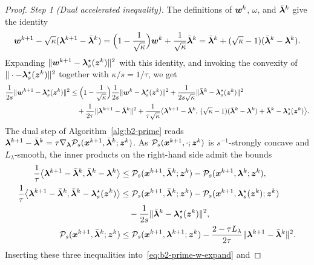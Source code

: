 \begin{proof}
\emph{Step 1 (Dual accelerated inequality).} The definitions of \(\bm{w}^k\), \(\omega\), and \(\bar{\bm{\lambda}}^k\) give the identity
\[
    \bm{w}^{k+1}-\sqrt{\kappa}(\bm{\lambda}^{k+1}-\bar{\bm{\lambda}}^k)
    =\Bigl(1-\frac{1}{\sqrt{\kappa}}\Bigr)\bm{w}^k
    +\frac{1}{\sqrt{\kappa}}\bar{\bm{\lambda}}^k
    =\bar{\bm{\lambda}}^k+(\sqrt{\kappa}-1)(\bar{\bm{\lambda}}^k-\bm{\lambda}^k).
\]
Expanding \(\|\bm{w}^{k+1}-\bm{\lambda}_s^\star(\bm{z}^k)\|^2\) with this identity, and
invoking the convexity of \(\|\cdot-\bm{\lambda}_s^\star(\bm{z}^k)\|^2\) together with
\(\kappa/s=1/\tau\), we get
\begin{equation}
\begin{aligned}
    \frac{1}{2s}\|\bm{w}^{k+1}-\bm{\lambda}_s^\star(\bm{z}^k)\|^2
    &\le\Bigl(1-\frac{1}{\sqrt{\kappa}}\Bigr)
    \frac{1}{2s}\|\bm{w}^k-\bm{\lambda}_s^\star(\bm{z}^k)\|^2
    +\frac{1}{2s\sqrt{\kappa}}\|\bar{\bm{\lambda}}^k-\bm{\lambda}_s^\star(\bm{z}^k)\|^2\\
    &\quad+\frac{1}{2\tau}\|\bm{\lambda}^{k+1}-\bar{\bm{\lambda}}^k\|^2
    +\frac{1}{\tau\sqrt{\kappa}}
    \bigl\langle\bm{\lambda}^{k+1}-\bar{\bm{\lambda}}^k,\, 
    (\sqrt{\kappa}-1)(\bar{\bm{\lambda}}^k-\bm{\lambda}^k)
    +\bar{\bm{\lambda}}^k-\bm{\lambda}_s^\star(\bm{z}^k)\bigr\rangle .
\end{aligned}
\label{eq:b2-prime-w-expand}
\end{equation}
The dual step of Algorithm~\ref{alg:b2-prime} reads
\(\bm{\lambda}^{k+1}-\bar{\bm{\lambda}}^k
=\tau\nabla_{\bm{\lambda}}\mathcal P_s(\bm{x}^{k+1},\bar{\bm{\lambda}}^k;\bm{z}^k)\). As
\(\mathcal P_s(\bm{x}^{k+1},\cdot;\bm{z}^k)\) is \(s^{-1}\)-strongly concave and
\(L_\lambda\)-smooth, the inner products on the right-hand side admit the bounds
\begin{align*}
    \frac1\tau\bigl\langle\bm{\lambda}^{k+1}-\bar{\bm{\lambda}}^k,
    \bar{\bm{\lambda}}^k-\bm{\lambda}^k\bigr\rangle
    &\le\mathcal P_s(\bm{x}^{k+1},\bar{\bm{\lambda}}^k;\bm{z}^k)
    -\mathcal P_s(\bm{x}^{k+1},\bm{\lambda}^k;\bm{z}^k),\\
    \frac1\tau\bigl\langle\bm{\lambda}^{k+1}-\bar{\bm{\lambda}}^k,
    \bar{\bm{\lambda}}^k-\bm{\lambda}_s^\star(\bm{z}^k)\bigr\rangle
    &\le\mathcal P_s(\bm{x}^{k+1},\bar{\bm{\lambda}}^k;\bm{z}^k)
    -\mathcal P_s(\bm{x}^{k+1},\bm{\lambda}_s^\star(\bm{z}^k);\bm{z}^k)\\
    &\quad-\frac{1}{2s}\|\bar{\bm{\lambda}}^k-\bm{\lambda}_s^\star(\bm{z}^k)\|^2,\\
    \mathcal P_s(\bm{x}^{k+1},\bar{\bm{\lambda}}^k;\bm{z}^k)
    &\le\mathcal P_s(\bm{x}^{k+1},\bm{\lambda}^{k+1};\bm{z}^k)
    -\frac{2-\tau L_\lambda}{2\tau}\|\bm{\lambda}^{k+1}-\bar{\bm{\lambda}}^k\|^2 .
\end{align*}
Inserting these three inequalities into~\eqref{eq:b2-prime-w-expand} and

\end{proof}
